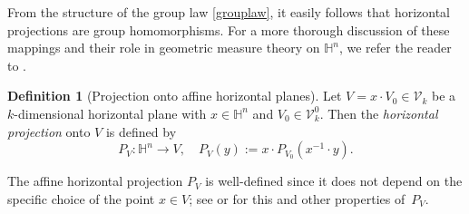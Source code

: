 \documentclass[12pt]{amsart}
\numberwithin{equation}{section}
\theoremstyle{plain}
\theoremstyle{definition}
\newtheorem{definition}[theorem]{Definition}
\theoremstyle{remark}
\begin{document}
From the structure of the group law \eqref{grouplaw}, it easily follows that horizontal projections are group homomorphisms. For a more thorough discussion of these mappings and their role in geometric measure theory on $\mathbb{H}^n$, we refer the reader to \cite{MR2789472,MR2955184}.

\begin{definition}[Projection onto affine horizontal planes]\label{d:AffHeisProj}
    Let $V= x\cdot V_0 \in \mathcal{V}_k$ be a $k$-dimensional horizontal plane with $x\in \mathbb{H}^n$ and  $V_0\in  \mathcal{V}_k^0$. Then the \emph{horizontal projection} onto $V$ is defined by
    \begin{displaymath}
        P_V:\mathbb{H}^n \to V,\quad P_V(y):= x \cdot P_{V_0}(x^{-1}\cdot y).
    \end{displaymath}
\end{definition}
The affine horizontal projection $P_V$ is well-defined 
 since it does not depend on the specific choice of the point $x\in V$; see \cite[\S 2]{Hahlomaa} or \cite[\S 4.1.2]{FV2} for this and other properties of~$P_V$.
\end{document}

